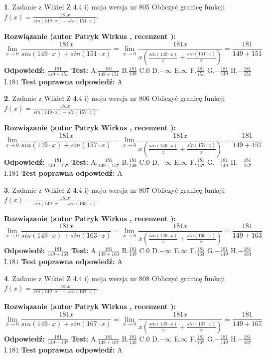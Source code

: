 \documentclass[12pt, a4paper]{article}
\theoremstyle{definition} %
\newtheorem{zad}{}
\newcommand{\zadStart}[1]{\begin{zad}#1\newline}
\newcommand{\zadStop}{\end{zad}}
\newcommand{\rozwStart}[2]{\noindent \textbf{Rozwiązanie (autor #1 , recenzent #2): }\newline}
\newcommand{\rozwStop}{\newline}
\newcommand{\odpStart}{\noindent \textbf{Odpowiedź:}\newline}
\newcommand{\odpStop}{\newline}
\newcommand{\testStart}{\noindent \textbf{Test:}\newline}
\newcommand{\testStop}{\newline}
\newcommand{\kluczStart}{\noindent \textbf{Test poprawna odpowiedź:}\newline}
\newcommand{\kluczStop}{\newline}
\begin{document}
\zadStart{Zadanie z Wikieł Z 4.4 i) moja wersja nr 805}
Obliczyć granicę funkcji $f(x)=\frac{181x}{sin(149\cdot x) +sin(151\cdot x)}$.
\zadStop
\rozwStart{Patryk Wirkus}{}
$$\lim\limits_{x\to 0}\frac{181x}{sin(149\cdot x) +sin(151\cdot x)}=\lim\limits_{x\to 0}\frac{181x}{x(\frac{sin(149\cdot x)}{x}+\frac{sin(151\cdot x)}{x})}=\frac{181}{149+151}$$
\rozwStop
\odpStart
$\frac{181}{149+151}$
\odpStop
\testStart
A.$\frac{181}{149+151}$
B.$\frac{181}{149}$
C.$0$
D.$-\infty$
E.$\infty$
F.$\frac{181}{151}$
G.$-\frac{181}{149}$
H.$-\frac{181}{151}$
I.$181$
\testStop
\kluczStart
A
\kluczStop



\zadStart{Zadanie z Wikieł Z 4.4 i) moja wersja nr 806}
Obliczyć granicę funkcji $f(x)=\frac{181x}{sin(149\cdot x) +sin(157\cdot x)}$.
\zadStop
\rozwStart{Patryk Wirkus}{}
$$\lim\limits_{x\to 0}\frac{181x}{sin(149\cdot x) +sin(157\cdot x)}=\lim\limits_{x\to 0}\frac{181x}{x(\frac{sin(149\cdot x)}{x}+\frac{sin(157\cdot x)}{x})}=\frac{181}{149+157}$$
\rozwStop
\odpStart
$\frac{181}{149+157}$
\odpStop
\testStart
A.$\frac{181}{149+157}$
B.$\frac{181}{149}$
C.$0$
D.$-\infty$
E.$\infty$
F.$\frac{181}{157}$
G.$-\frac{181}{149}$
H.$-\frac{181}{157}$
I.$181$
\testStop
\kluczStart
A
\kluczStop



\zadStart{Zadanie z Wikieł Z 4.4 i) moja wersja nr 807}
Obliczyć granicę funkcji $f(x)=\frac{181x}{sin(149\cdot x) +sin(163\cdot x)}$.
\zadStop
\rozwStart{Patryk Wirkus}{}
$$\lim\limits_{x\to 0}\frac{181x}{sin(149\cdot x) +sin(163\cdot x)}=\lim\limits_{x\to 0}\frac{181x}{x(\frac{sin(149\cdot x)}{x}+\frac{sin(163\cdot x)}{x})}=\frac{181}{149+163}$$
\rozwStop
\odpStart
$\frac{181}{149+163}$
\odpStop
\testStart
A.$\frac{181}{149+163}$
B.$\frac{181}{149}$
C.$0$
D.$-\infty$
E.$\infty$
F.$\frac{181}{163}$
G.$-\frac{181}{149}$
H.$-\frac{181}{163}$
I.$181$
\testStop
\kluczStart
A
\kluczStop



\zadStart{Zadanie z Wikieł Z 4.4 i) moja wersja nr 808}
Obliczyć granicę funkcji $f(x)=\frac{181x}{sin(149\cdot x) +sin(167\cdot x)}$.
\zadStop
\rozwStart{Patryk Wirkus}{}
$$\lim\limits_{x\to 0}\frac{181x}{sin(149\cdot x) +sin(167\cdot x)}=\lim\limits_{x\to 0}\frac{181x}{x(\frac{sin(149\cdot x)}{x}+\frac{sin(167\cdot x)}{x})}=\frac{181}{149+167}$$
\rozwStop
\odpStart
$\frac{181}{149+167}$
\odpStop
\testStart
A.$\frac{181}{149+167}$
B.$\frac{181}{149}$
C.$0$
D.$-\infty$
E.$\infty$
F.$\frac{181}{167}$
G.$-\frac{181}{149}$
H.$-\frac{181}{167}$
I.$181$
\testStop
\kluczStart
A
\kluczStop
\end{document}
